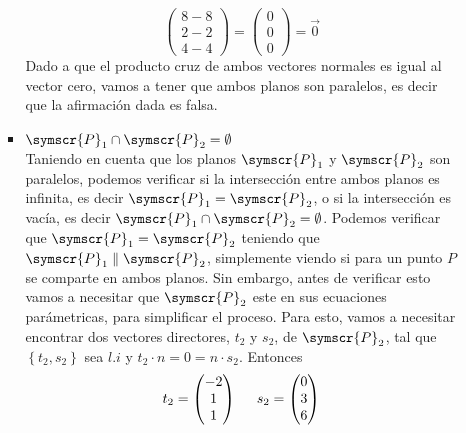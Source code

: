 \documentclass{article}
\def\fancyP{\symscr{P}}
\begin{document}
\begin{enumerate}
\begin{itemize}
\begin{itemize}
\[\begin{pmatrix}
                            8 - 8 \\
                            2 - 2 \\ 
                            4 - 4
                        \end{pmatrix}
                        =
                        \begin{pmatrix}
                            0 \\ 0 \\ 0
                        \end{pmatrix}
                        =
                        \vec{0}
                    \]
                    Dado a que el producto cruz de ambos vectores normales es igual al vector cero, vamos a tener que ambos planos son paralelos, es decir 
                    que la afirmación dada es falsa.
                \item \(\fancyP_1 \cap \fancyP_2 = \emptyset\) \\
                    Taniendo en cuenta que los planos \(\fancyP_1\) y \(\fancyP_2\) son paralelos, podemos verificar si la intersección entre ambos planos es infinita, 
                    es decir \(\fancyP_1 = \fancyP_2\), o si la intersección es vacía, es decir \(\fancyP_1 \cap \fancyP_2 = \emptyset\).
                    Podemos verificar que \(\fancyP_1 = \fancyP_2\) teniendo que \(\fancyP_1 \parallel \fancyP_2\), simplemente viendo si para un punto \(P\) se comparte
                    en ambos planos. Sin embargo, antes de verificar esto vamos a necesitar que \(\fancyP_2\) este en sus ecuaciones parámetricas, para simplificar el proceso.
                    Para esto, vamos a necesitar encontrar dos vectores directores, \(t_2\) y \(s_2\), de \(\fancyP_2\), tal que \(\left\{t_2, s_2\right\}\) sea \(l.i\) y 
                    \(t_2 \cdot n = 0 = n \cdot s_2\). Entonces
                    \[
                        t_2 = 
                        \begin{pmatrix}
                            -2 \\ 1 \\ 1
                        \end{pmatrix}
                        \hspace{0.5cm}
                        s_2  =
                        \begin{pmatrix}
                            0 \\ 3 \\ 6
                        \end{pmatrix}
\]
\end{itemize}
\end{itemize}
\end{enumerate}
\end{document}

